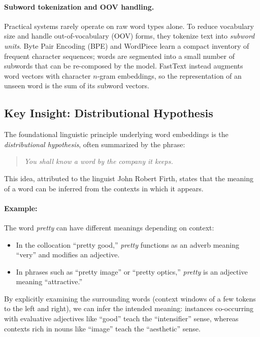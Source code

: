 \paragraph{Subword tokenization and OOV handling.} Practical systems rarely operate on raw word types alone. To reduce vocabulary size and handle out-of-vocabulary (OOV) forms, they tokenize text into \emph{subword units}. Byte Pair Encoding (BPE) and WordPiece learn a compact inventory of frequent character sequences; words are segmented into a small number of subwords that can be re-composed by the model. FastText instead augments word vectors with character \(n\)-gram embeddings, so the representation of an unseen word is the sum of its subword vectors.

\subsection{Key Insight: Distributional Hypothesis}
\label{sec:nlp_key_insight_distributional_hypothesis}

The foundational linguistic principle underlying word embeddings is the \emph{distributional hypothesis}, often summarized by the phrase:
\begin{quote}
\textit{You shall know a word by the company it keeps.}
\end{quote}
This idea, attributed to the linguist John Robert Firth, states that the meaning of a word can be inferred from the contexts in which it appears.

\paragraph{Example:} The word \emph{pretty} can have different meanings depending on context:
\begin{itemize}
    \item In the collocation ``pretty good,'' \emph{pretty} functions as an adverb meaning ``very'' and modifies an adjective.
    \item In phrases such as ``pretty image'' or ``pretty optics,'' \emph{pretty} is an adjective meaning ``attractive.''
\end{itemize}
By explicitly examining the surrounding words (context windows of a few tokens to the left and right), we can infer the intended meaning: instances co-occurring with evaluative adjectives like ``good'' teach the ``intensifier'' sense, whereas contexts rich in nouns like ``image'' teach the ``aesthetic'' sense.

